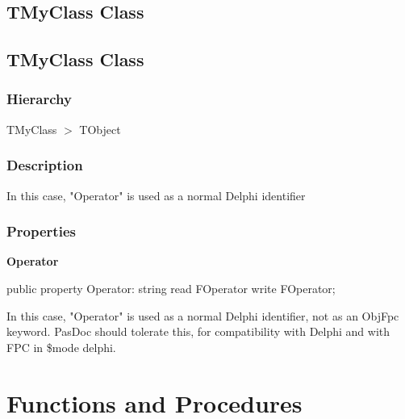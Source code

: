 \documentclass{report}
\newif\ifpdf
\begin{document}
\subsection*{\large{\textbf{TMyClass Class}}\normalsize\hspace{1ex}\hrulefill}
\else
\subsection*{TMyClass Class}
\fi
\label{ok_operator_test.TMyClass}
\subsubsection*{\large{\textbf{Hierarchy}}\normalsize\hspace{1ex}\hfill}
TMyClass {$>$} TObject
\subsubsection*{\large{\textbf{Description}}\normalsize\hspace{1ex}\hfill}
In this case, "Operator" is used as a normal Delphi identifier\subsubsection*{\large{\textbf{Properties}}\normalsize\hspace{1ex}\hfill}
\begin{list}{}{
\setlength{\itemindent}{0cm}
\setlength{\listparindent}{0cm}
\setlength{\leftmargin}{\evensidemargin}
\addtolength{\leftmargin}{\tmplength}
\settowidth{\labelsep}{X}
\addtolength{\leftmargin}{\labelsep}
\setlength{\labelwidth}{\tmplength}
}
\label{ok_operator_test.TMyClass-Operator}
\item[\textbf{Operator}\hfill]
\ifpdf
\begin{flushleft}
\fi
\begin{ttfamily}
public property Operator: string read FOperator write FOperator;\end{ttfamily}

\ifpdf
\end{flushleft}
\fi


\par In this case, "Operator" is used as a normal Delphi identifier, not as an ObjFpc keyword. PasDoc should tolerate this, for compatibility with Delphi and with FPC in {\$}mode delphi.\end{list}
\section{Functions and Procedures}
\ifpdf
\end{document}
